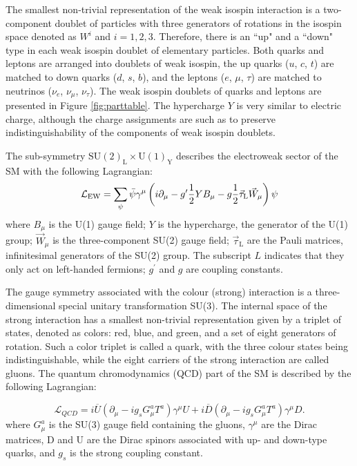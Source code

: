 The smallest non-trivial representation of the weak isospin interaction is
a two-component doublet of particles with three generators
of rotations in the isospin space denoted as $W^i$ and $i=1,2,3$.
Therefore, there is an ``up" and a ``down" type in each weak isospin doublet of elementary particles.
Both quarks and leptons are arranged into doublets of weak isospin, the up quarks ($u$, $c$, $t$)
are matched to down quarks ($d$, $s$, $b$), and the leptons ($e$, $\mu$, $\tau$) are matched
to neutrinos ($\nu_e$, $\nu_{\mu}$, $\nu_{\tau}$). The weak isospin doublets of quarks and leptons
are presented in Figure \ref{fig:parttable}.  
The hypercharge $Y$ is very similar to electric charge, although the charge assignments
are such as to preserve indistinguishability of the components
of weak isospin doublets.

The sub-symmetry $\text{SU}(2)_\text{L} \times \text{U}(1)_\text{Y}$ describes the electroweak sector of the SM with the 
following Lagrangian:
\begin{equation}
\mathcal{L}_\mathrm{EW} = \sum_\psi\bar\psi\gamma^\mu \left(i\partial_\mu-g^\prime{1\over2}YB_\mu-g{1\over2}\vec\tau_\mathrm{L}\vec W_\mu\right)\psi
\label{eqn:LagrEWK}
\end{equation}
where $B_{\mu}$ is the U(1) gauge field; $Y$ is the hypercharge, the generator of 
the U(1) group; $\vec{W}_\mu$ is the three-component SU(2) gauge field; $\vec{\tau}_\mathrm{L}$
 are the Pauli matrices, infinitesimal generators of the SU(2) group. 
The subscript $L$ indicates that they only act on left-handed fermions; $g^{'}$ and $g$
 are coupling constants.


The gauge symmetry associated with the colour (strong) interaction is a three-dimensional special
unitary transformation SU(3). The internal space of the strong interaction has a smallest
non-trivial representation given by a triplet of states, denoted as colors: red, blue, and green,
and a set of eight generators of rotation. Such a color triplet is called a quark, with the
three colour states being indistinguishable, while the
eight carriers of the strong interaction are called gluons. 
The quantum chromodynamics (QCD)
part of the SM is described by the following Lagrangian:

\begin{equation}
\mathcal{L}_{QCD} = i\overline U (\partial_\mu-ig_sG_\mu^a T^a)\gamma^\mu U + i\overline D (\partial_\mu-i g_s G_\mu^a T^a)\gamma^\mu D.
\label{eqn:LagrQCD}
\end{equation}
where $G_\mu^a$ is the SU(3) gauge field containing the gluons, $\gamma^\mu$ are the Dirac matrices,
 D and U are the Dirac spinors associated with up- and down-type quarks, and $g_s$ 
is the strong coupling constant.

